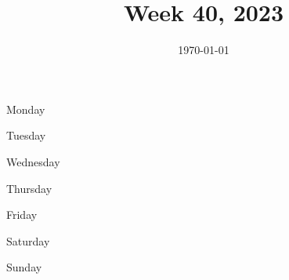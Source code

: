 \documentclass[10pt, a5paper, final, oneside]{memoir}
\title{Week 40, 2023}
\author{}
\date{\today}
\begin{document}
\frontmatter
\maketitle
\mainmatter

Monday

\newpage

Tuesday

\newpage

Wednesday

\newpage

Thursday

\newpage

Friday

\newpage

Saturday

\newpage

Sunday

\backmatter
\end{document}
